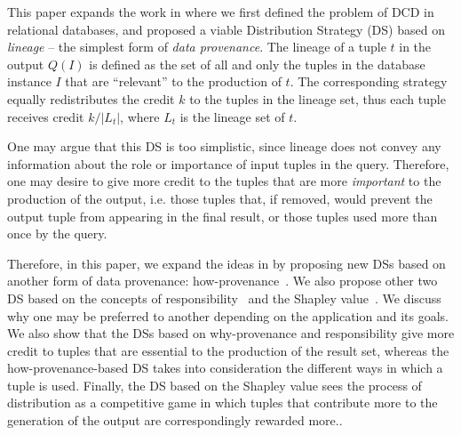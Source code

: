 \documentclass[preprint,12pt,sort&compress]{elsarticle}
\newcommand{\rtwo}[1]{\textcolor{reviewer2}{#1}}
\newcommand{\scream}[1]{{\bf * #1 *}{\typeout{#1}}}
\begin{document}
This paper expands the work in \citep{dosso2020data} %
where we first defined the problem of DCD in relational databases, and proposed a viable Distribution Strategy (DS) based on \emph{lineage} -- the simplest form of \emph{data provenance}.
The lineage of a tuple $t$ in the output $Q(I)$ is defined as the set of all and only the tuples in the database instance $I$ that are ``relevant'' to the production of $t$.
The corresponding strategy equally redistributes the credit $k$ to the tuples in the lineage set, thus each tuple receives credit $k/|L_t|$, where $L_t$ is the lineage set of $t$. 

One may argue that this DS is too simplistic, since lineage 
does not convey any information about the role or importance of input tuples in the query.
Therefore, one may desire to give more credit to the tuples that are more {\em important} to the production of the output, i.e. those tuples that, if removed, would prevent the output tuple from appearing in the final result, or those tuples used more than once  by the query. 

Therefore, in this paper, we expand the ideas in \citep{dosso2020data} by proposing new DSs based on another form of data provenance:  how-provenance~\citep{howProvenanceGreen}.
We also propose other two DS based on the concepts of responsibility~\cite{MeliouGMS11} and the Shapley value~\cite{LivshitsBKS20,DFKM22}.
We discuss why one may be preferred to another depending on the application and its goals. 
We also show that the DSs based on why-provenance and \rtwo{responsibility} give more credit to tuples that are essential to the production of the result set, whereas the how-provenance-based DS takes into consideration the different ways in which a tuple is used.
\rtwo{Finally, the DS based on the Shapley value sees the process of distribution as a competitive game in which tuples that contribute more to the generation of the output are correspondingly rewarded more.}. 
\end{document}
